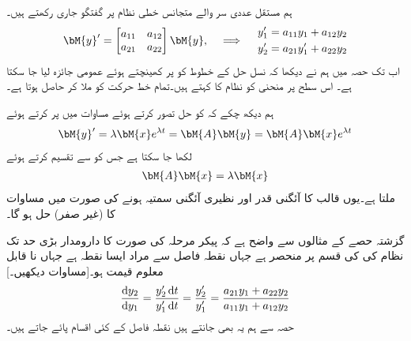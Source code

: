 
ہم مستقل عددی سر والے متجانس خطی نظام  پر گفتگو جاری رکھتے ہیں۔
\begin{gather}\label{مساوات_نظام_جانچ_نقطہ_فاصل_الف}
\begin{aligned}
\bM{y}'=\begin{bmatrix} a_{11} & a_{12} \\ a_{21} & a_{22} \end{bmatrix} \bM{y}
\end{aligned}, \quad \implies \quad 
\begin{aligned}
y_1'&=a_{11}y_1+a_{12}y_2\\
y_2'&=a_{21}y_1'+a_{22}y_2
\end{aligned}
\end{gather}
اب تک  حصہ  میں ہم نے دیکھا کہ نسل حل  کے خطوط کو   پر کھینچتے ہوئے عمومی جائزہ لیا جا سکتا ہے۔ اس سطح پر منحنی کو نظام  کا  کہتے ہیں۔تمام خط حرکت کو ملا کر  حاصل ہوتا ہے۔

ہم دیکھ چکے کہ  کو حل تصور کرتے ہوئے مساوات  میں پر کرتے ہوئے
\begin{align*}
\bM{y}'=\lambda \bM{x}e^{\lambda t}=\bM{A}\bM{y}=\bM{A}\bM{x}e^{\lambda t}
\end{align*}
لکھا جا سکتا ہے جس کو  سے تقسیم کرتے ہوئے
\begin{align}\label{مساوات_نظام_جانچ_نقطہ_فاصل_ب}
\bM{A}\bM{x}=\lambda \bM{x}
\end{align}
ملتا ہے۔یوں  قالب   کا آئگنی قدر اور  نظیری آئگنی سمتیہ ہونے کی صورت میں   مساوات  کا (غیر صفر) حل ہو گا۔

گزشتہ حصے کے مثالوں سے واضح ہے کہ پیکر مرحلہ کی صورت کا دارومدار بڑی حد تک نظام  کی  کی قسم پر منحصر ہے جہاں نقطہ فاصل سے مراد ایسا نقطہ ہے جہاں  نا قابل معلوم قیمت  ہو۔[مساوات  دیکھیں۔]
\begin{align}\label{مساوات_نظام_جانچ_نقطہ_فاصل_پ}
\frac{\dif y_2}{\dif y_1}=\frac{y_2' \dif t}{y_1'\dif t}=\frac{y_2'}{y_1'}=\frac{a_{21}y_1+a_{22}y_2}{a_{11}y_1+a_{12}y_2}
\end{align}
حصہ   سے ہم یہ بھی جانتے ہیں نقطہ فاصل کے کئی اقسام پائے جاتے ہیں۔

